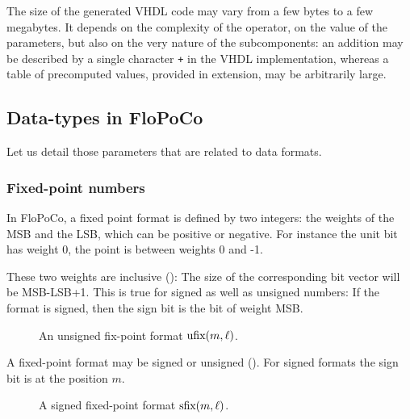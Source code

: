 \documentclass{article}
\begin{document}

\medskip

The size of the generated VHDL code may vary from a few bytes to a few megabytes.
It depends on the complexity of the operator, on the value of the parameters, but also on the very nature of the subcomponents: an addition may be described by a single character \texttt{+} in the VHDL implementation, whereas a table of precomputed values, provided in extension, may be arbitrarily large.


\subsection{Data-types in FloPoCo\label{sec:data-types}}
Let us detail those parameters that are related to data formats.
\subsubsection{Fixed-point numbers}
In FloPoCo, a fixed point format is defined by two integers: the weights of the MSB and the LSB, which can be positive or negative. 
For instance the unit bit has weight 0, the point is between weights 0 and -1. 

These two weights are inclusive (): The size of the corresponding bit vector will be MSB-LSB+1.
This is true for signed as well as unsigned numbers: If the format is signed, then the sign bit is the bit of weight MSB.

  \begin{figure}[h!]
  \begin{center}
  \end{center}
    \vspace{-2ex}
  \caption{An unsigned fix-point format $\text{ufix}(m,\ell)$.}
  \label{fig:ufixformat}
\end{figure}


A fixed-point format may be signed or unsigned ().
For signed formats the sign bit is at the position $m$.

\begin{figure}[h!]
  \begin{center}
    \end{center}
    \vspace{-2ex}
  \caption{A signed fixed-point format $\text{sfix}(m,\ell)$.}
  \label{fig:sfixformat}
\end{figure}
\end{document}
